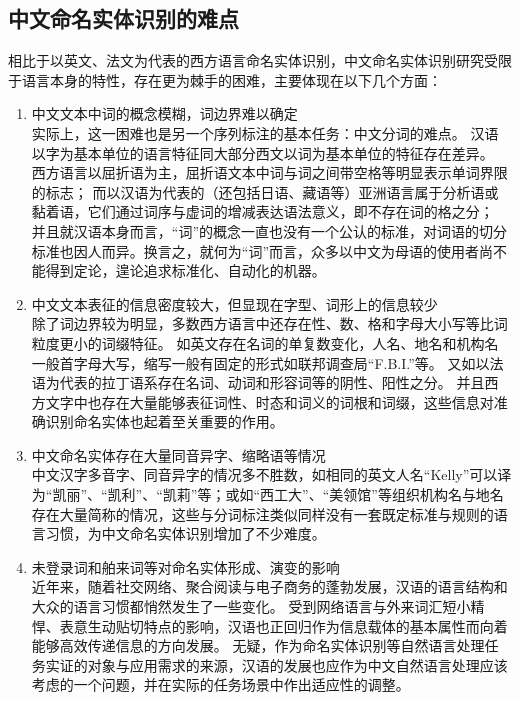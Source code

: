\subsection{中文命名实体识别的难点}
相比于以英文、法文为代表的西方语言命名实体识别，中文命名实体识别研究受限于语言本身的特性，存在更为棘手的困难，主要体现在以下几个方面：
\begin{enumerate}[（1）]
    \item 中文文本中词的概念模糊，词边界难以确定\\
        实际上，这一困难也是另一个序列标注的基本任务：中文分词的难点。
        汉语以字为基本单位的语言特征同大部分西文以词为基本单位的特征存在差异。
        西方语言以屈折语为主，屈折语文本中词与词之间带空格等明显表示单词界限的标志；
        而以汉语为代表的（还包括日语、藏语等）亚洲语言属于分析语或黏着语，它们通过词序与虚词的增减表达语法意义，即不存在词的格之分；
        并且就汉语本身而言，“词”的概念一直也没有一个公认的标准，对词语的切分标准也因人而异。换言之，就何为“词”而言，众多以中文为母语的使用者尚不能得到定论，遑论追求标准化、自动化的机器。
    \item 中文文本表征的信息密度较大，但显现在字型、词形上的信息较少\\
        除了词边界较为明显，多数西方语言中还存在性、数、格和字母大小写等比词粒度更小的词缀特征。
        如英文存在名词的单复数变化，人名、地名和机构名一般首字母大写，缩写一般有固定的形式如联邦调查局“F.B.I.”等。
        又如以法语为代表的拉丁语系存在名词、动词和形容词等的阴性、阳性之分。
        并且西方文字中也存在大量能够表征词性、时态和词义的词根和词缀，这些信息对准确识别命名实体也起着至关重要的作用。
    \item 中文命名实体存在大量同音异字、缩略语等情况\\
        中文汉字多音字、同音异字的情况多不胜数，如相同的英文人名“Kelly”可以译为“凯丽”、“凯利”、“凯莉”等；或如“西工大”、“美领馆”等组织机构名与地名存在大量简称的情况，这些与分词标注类似同样没有一套既定标准与规则的语言习惯，为中文命名实体识别增加了不少难度。
    \item 未登录词和舶来词等对命名实体形成、演变的影响\\
        近年来，随着社交网络、聚合阅读与电子商务的蓬勃发展，汉语的语言结构和大众的语言习惯都悄然发生了一些变化。
        受到网络语言与外来词汇短小精悍、表意生动贴切特点的影响，汉语也正回归作为信息载体的基本属性而向着能够高效传递信息的方向发展。
        无疑，作为命名实体识别等自然语言处理任务实证的对象与应用需求的来源，汉语的发展也应作为中文自然语言处理应该考虑的一个问题，并在实际的任务场景中作出适应性的调整。
\end{enumerate}
